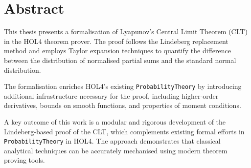 \chapter*{Abstract}
\label{abstract}

This thesis presents a formalisation of Lyapunov’s Central Limit Theorem (CLT) in the HOL4 theorem prover. The proof follows the Lindeberg replacement method and employs Taylor expansion techniques to quantify the difference between the distribution of normalised partial sums and the standard normal distribution.

The formalisation enriches HOL4’s existing \texttt{ProbabilityTheory} by introducing additional infrastructure necessary for the proof, including higher-order derivatives, bounds on smooth functions, and properties of moment conditions.

A key outcome of this work is a modular and rigorous development of the Lindeberg-based proof of the CLT, which complements existing formal efforts in \texttt{ProbabilityTheory} in HOL4. The approach demonstrates that classical analytical techniques can be accurately mechanised using modern theorem proving tools.
